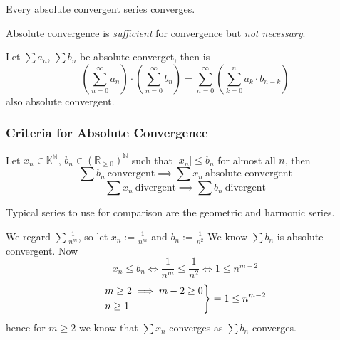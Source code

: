 \begin{theorem}
   Every absolute convergent series converges.
\end{theorem}
\begin{remark}
   Absolute convergence is \emph{sufficient} for convergence but \emph{not necessary}.
\end{remark}

\begin{theorem}
   Let \(\sum a_n\), \(\sum b_n\) be absolute converget, then is
   \[\left(\sum_{n=0}^\infty a_n\right) \cdot \left(\sum_{n=0}^\infty b_n\right) = \sum_{n=0}^\infty\left(\sum_{k=0}^n a_k \cdot b_{n - k}\right)\]
   also absolute convergent.
\end{theorem}

\newpage

\subsubsection{Criteria for Absolute Convergence}
\begin{proposition}\label{pro:comparison_test}
   Let \(x_n \in \mathbb{K}^\mathbb{N}\), \(b_n \in (\mathbb{R}_{\geq 0})^\mathbb{N}\) such that \(\lvert x_n\rvert \leq b_n\) for almost all \(n\), then
   \[\sum b_n~\text{convergent} \implies \sum x_n~\text{absolute convergent}\]
   \[\sum x_n~\text{divergent} \implies \sum b_n~\text{divergent}\]
\end{proposition}
\begin{remark}
   Typical series to use for comparison are the geometric and harmonic series.
\end{remark}
\begin{example}
   We regard \(\sum \frac{1}{n^m}\), so let \(x_n := \frac{1}{n^m}\) and \(b_n := \frac{1}{n^2}\)
   We know \(\sum b_n\) is absolute convergent.
   Now
   \[x_n \leq b_n \iff \frac{1}{n^m} \leq \frac{1}{n^2} \iff 1 \leq n^{m-2}\]
   \[\begin{drcases}m \geq 2 \implies m-2 \geq 0\\n \geq 1\end{drcases} = 1 \leq n^{m-2}\]
   hence for \(m \geq 2\) we know that \(\sum x_n\) converges as \(\sum b_n\) converges.
\end{example}

